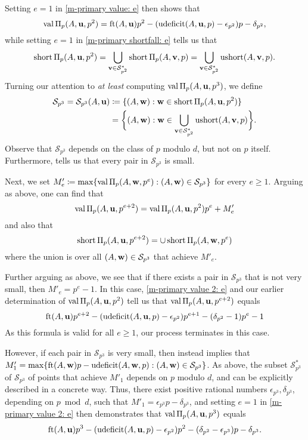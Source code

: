 \documentclass[11pt]{amsart}
\newcommand{\short}{\operatorname{short}}
\newcommand{\ushort}{\operatorname{ushort}}
\newcommand{\udeficit}{\operatorname{udeficit}}
\newcommand{\denom}{d}
\renewcommand{\S}{\mathcal{S}}
\begin{document}
Setting $e=1$ in \eqref{m-primary value: e} then shows that 
%
\[ \val \IP_p(A,\vv{u},p^2) = \ft{A}{\vv{u}}p^2 - (\udeficit(A,\vv{u},p)-\epsilon_{p^2})p - \delta_{p^2},  \] 
%
while setting $e=1$ in \eqref{m-primary shortfall: e} tells us that
%
\[ \short \IP_p(A,\vv{u},p^2) = \bigcup_{\vv{v} \in \S_{p^2}^{\ast}} \short \IP_p(A,\vv{v},p) = \bigcup_{\vv{v} \in \S_{p^2}^{\ast}} \ushort(A,\vv{v},p). \]  
%
Turning our attention to \emph{at least} computing $\operatorname{val} \Pi_p(A,\mathbf{u},p^3)$, we define
\begin{align*}
\S_{p^3} = \S_{p^3}(A,\vv{u}) & \coloneqq \{ (A,\vv{w}):  \vv{w} \in \short \IP_p(A,\vv{u},p^2) \} \\
 & = \bigg\{ (A,\vv{w}): \vv{w} \in \bigcup_{\vv{v} \in \S_{p^2}^{\ast}} \ushort(A,\vv{v},p) \bigg\}. 
 \end{align*}
%
Observe that $\S_{p^3}$ depends on the class of $p$ modulo $\denom$, but not on $p$ itself.  Furthermore,  tells us that every pair in $\S_{p^3}$ is small.


Next, we set $M'_e  \coloneqq \max \{ \val \IP_p(A, \vv{w}, p^e) :  (A,\vv{w}) \in \S_{p^3}\}$ for every $e \geq 1$.  Arguing as above, one can find that%
\begin{equation}
\label{m-primary value 2: e}
 \operatorname{val} \Pi_p(A,\mathbf{u},p^{e+2}) = \operatorname{val} \Pi_p(A,\mathbf{u},p^2)p^e+ M'_e
 \end{equation}
and also that 
%
\begin{equation}
\label{m-primary shortfall 2: e}
\short \IP_p(A,\vv{u},p^{e+2}) = \cup \short \IP_p(A,\vv{w}, p^e)
\end{equation}
where the union is over all $(A,\vv{w}) \in \S_{p^3}$ that achieve $M'_e$.

Further arguing as above, we see that if there exists a pair in $\S_{p^3}$ that is not very small, then $M'_e = p^e-1$.  In this case,  \eqref{m-primary value 2: e} and our earlier determination of $\operatorname{val} \Pi_p(A,\mathbf{u},p^2)$ tell us that $\operatorname{val} \Pi_p(A,\mathbf{u},p^{e+2})$ equals
%
\[ \ft{A}{\vv{u}}p^{e+2} - (\udeficit(A,\vv{u},p)-\epsilon_{p^2})p^{e+1} - (\delta_{p^2}-1)p^e -1 \] 
%
As this formula is valid for all $e \geq 1$, our process terminates in this case.

However, if each pair in $\S_{p^3}$ is very small, then  instead implies that $M'_1 = \max \{ \ft{A}{\vv{w}}p-\udeficit(A,\vv{w},p) : (A,\vv{w}) \in \S_{p^3}\}$.  As above, the subset $\S^{\ast}_{p^3}$ of $\S_{p^3}$ of points that achieve $M'_1$ depends on $p$ modulo $\denom$, and can be explicitly described in a concrete way.  Thus, there exist positive rational numbers $\epsilon_{p^3}, \delta_{p^3}$, depending on $p \bmod \denom$, such that $M'_1 = \epsilon_{p^3} p -\delta_{p^3}$, and setting $e=1$ in \eqref{m-primary value 2: e} then demonstrates that $\operatorname{val} \Pi_p(A,\mathbf{u},p^3)$ equals
%
\[ \ft{A}{\vv{u}}p^{3} - (\udeficit(A,\vv{u},p)-\epsilon_{p^2})p^{2} - (\delta_{p^2}- \epsilon_{p^3})p -\delta_{p^3}. \] 
%
\end{document}
